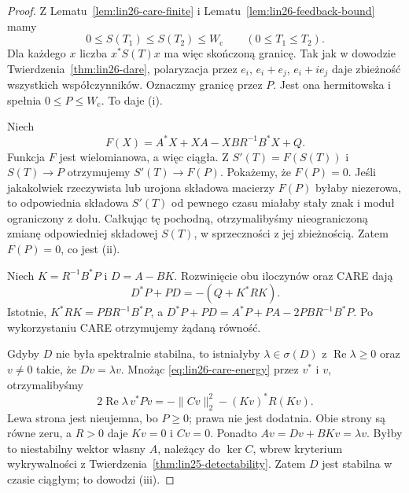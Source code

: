 \begin{proof}
Z
Lematu~\ref{lem:lin26-care-finite}
i
Lematu~\ref{lem:lin26-feedback-bound}
mamy
\[
 0\le S(T_1)\le S(T_2)
           \le W_{\mathrm c}
 \qquad(0\le T_1\le T_2).
\]
Dla każdego \(x\)
liczba \(x^*S(T)x\)
ma więc skończoną granicę.
Tak jak w dowodzie
Twierdzenia~\ref{thm:lin26-dare},
polaryzacja przez
\(e_i\), \(e_i+e_j\),
\(e_i+ie_j\)
daje zbieżność
wszystkich współczynników.
Oznaczmy granicę
przez \(P\). Jest ona
hermitowska i spełnia
\(0\le P\le W_{\mathrm c}\).
To daje (i).

Niech
\[
 F(X)=A^*X+XA-XBR^{-1}B^*X+Q.
\]
Funkcja \(F\)
jest wielomianowa,
a więc ciągła.
Z \(S'(T)=F(S(T))\)
i \(S(T)\to P\)
otrzymujemy
\(S'(T)\to F(P)\).
Pokażemy, że \(F(P)=0\).
Jeśli jakakolwiek rzeczywista
lub urojona składowa
macierzy \(F(P)\)
byłaby niezerowa,
to odpowiednia składowa
\(S'(T)\) od pewnego czasu
miałaby stały znak
i moduł ograniczony z dołu.
Całkując tę pochodną,
otrzymalibyśmy
nieograniczoną zmianę
odpowiedniej składowej
\(S(T)\), w sprzeczności
z jej zbieżnością.
Zatem \(F(P)=0\),
co jest (ii).

Niech \(K=R^{-1}B^*P\)
i \(D=A-BK\).
Rozwinięcie obu iloczynów
oraz CARE dają
\[
 D^*P+PD=-(Q+K^*RK).
 \tag{26.5}\label{eq:lin26-care-energy}
\]
Istotnie,
\(K^*RK=PBR^{-1}B^*P\),
a
\(D^*P+PD=A^*P+PA
 -2PBR^{-1}B^*P\).
Po wykorzystaniu CARE
otrzymujemy żądaną równość.

Gdyby \(D\) nie była
spektralnie stabilna,
to istniałyby
\(\lambda\in\sigma(D)\)
z \(\operatorname{Re}\lambda\ge0\)
oraz \(v\ne0\) takie, że
\(Dv=\lambda v\).
Mnożąc
\eqref{eq:lin26-care-energy}
przez \(v^*\) i \(v\),
otrzymalibyśmy
\[
 2\operatorname{Re}\lambda\,
        v^*Pv
 =-\|Cv\|_2^2-(Kv)^*R(Kv).
\]
Lewa strona jest nieujemna,
bo \(P\ge0\);
prawa nie jest dodatnia.
Obie strony są równe zeru,
a \(R>0\) daje
\(Kv=0\) i \(Cv=0\).
Ponadto
\(Av=Dv+BKv=\lambda v\).
Byłby to niestabilny
wektor własny \(A\),
należący do \(\ker C\),
wbrew kryterium wykrywalności
z
Twierdzenia~\ref{thm:lin25-detectability}.
Zatem \(D\) jest stabilna
w czasie ciągłym;
to dowodzi (iii).


\end{proof}
